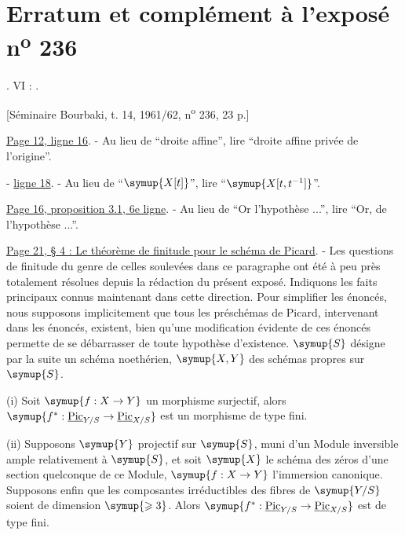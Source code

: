 \clearpage
\chapter*{Erratum et complément à l'exposé n\textsuperscript{o} 236}

.  VI : .

\begin{center}
[Séminaire Bourbaki, t. 14, 1961/62, n\textsuperscript{o} 236, 23 p.]
\end{center}

\noindent\uline{Page 12, ligne 16}. - Au lieu de ``droite affine'', lire
``droite affine privée de l'origine''.

\noindent- \quad \uline{ligne 18}. - Au lieu de ``$\symup{X[t]}$'', lire
``$\symup{X[t,t^{-1}]}$''.

\noindent\uline{Page 16, proposition 3.1, 6e ligne}. -
Au lieu de ``Or l'hypothèse ...'', lire ``Or, de l'hypothèse ...''.

\noindent\uline{Page 21, § 4 : Le théorème de finitude pour le schéma de
Picard}. - Les questions de finitude du genre de celles soulevées dans ce
paragraphe ont été à peu près totalement résolues depuis la rédaction du
présent exposé. Indiquons les faits principaux connus maintenant dans cette
direction. Pour simplifier les énoncés, nous supposons implicitement que tous
les préschémas de Picard, intervenant dans les énoncés, existent, bien qu'une
modification évidente de ces énoncés permette de se débarrasser de toute
hypothèse d'existence. $\symup{S}$ désigne par la suite un schéma noethérien, $\symup{X,Y}$ des
schémas propres sur $\symup{S}$.

\medskip
\noindent(i) Soit $\symup{f:X\to  Y}$ un morphisme surjectif, alors $\symup{f^*: \underline{\operatorname{Pic}}_{Y/S}\to \underline{\operatorname{Pic}}_{X/S}}$
est un morphisme de type fini.

\noindent(ii) Supposons $\symup{Y}$ projectif sur $\symup{S}$, muni d'un Module inversible
ample relativement à $\symup{S}$, et soit $\symup{X}$ le schéma des zéros d'une section
quelconque de ce Module, $\symup{f:X\to  Y}$ l'immersion canonique.
Supposons enfin que les composantes irréductibles des fibres de $\symup{Y/S}$ soient de
dimension $\symup{\geqslant3}$. Alors $\symup{f^*: \underline{\operatorname{Pic}}_{Y/S}\to \underline{\operatorname{Pic}}_{X/S}}$
est de type fini.

